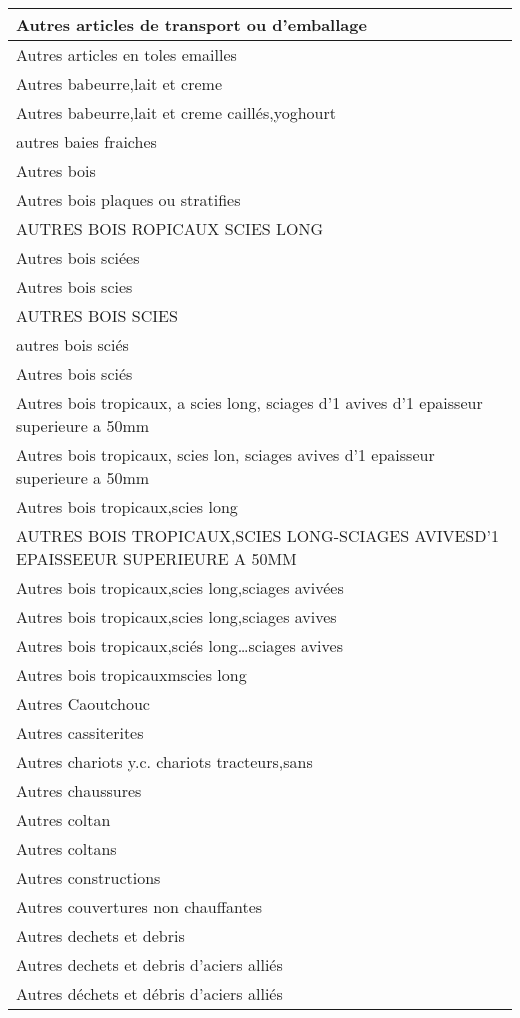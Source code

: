 \documentclass[
]{book}
\begin{document}
\begin{table}
\begin{tabular}[t]{l}
\hline
Autres articles de transport ou d'emballage\\
\hline
Autres articles en toles emailles\\
\hline
Autres babeurre,lait et creme\\
\hline
Autres babeurre,lait et creme caillés,yoghourt\\
\hline
autres baies fraiches\\
\hline
Autres bois\\
\hline
Autres bois plaques ou stratifies\\
\hline
AUTRES BOIS ROPICAUX SCIES LONG\\
\hline
Autres bois sciées\\
\hline
Autres bois scies\\
\hline
AUTRES BOIS SCIES\\
\hline
autres bois sciés\\
\hline
Autres bois sciés\\
\hline
Autres bois tropicaux, a scies long, sciages d'1 avives d'1 epaisseur superieure a 50mm\\
\hline
Autres bois tropicaux, scies lon, sciages avives d'1 epaisseur superieure a 50mm\\
\hline
Autres bois tropicaux,scies long\\
\hline
AUTRES BOIS TROPICAUX,SCIES LONG-SCIAGES AVIVESD'1 EPAISSEEUR SUPERIEURE A 50MM\\
\hline
Autres bois tropicaux,scies long,sciages avivées\\
\hline
Autres bois tropicaux,scies long,sciages avives\\
\hline
Autres bois tropicaux,sciés long…sciages avives\\
\hline
Autres bois tropicauxmscies long\\
\hline
Autres Caoutchouc\\
\hline
Autres cassiterites\\
\hline
Autres chariots y.c. chariots tracteurs,sans\\
\hline
Autres chaussures\\
\hline
Autres coltan\\
\hline
Autres coltans\\
\hline
Autres constructions\\
\hline
Autres couvertures non chauffantes\\
\hline
Autres dechets et debris\\
\hline
Autres dechets et debris d'aciers alliés\\
\hline
Autres déchets et débris d'aciers alliés\\

\end{tabular}
\end{table}
\end{document}
